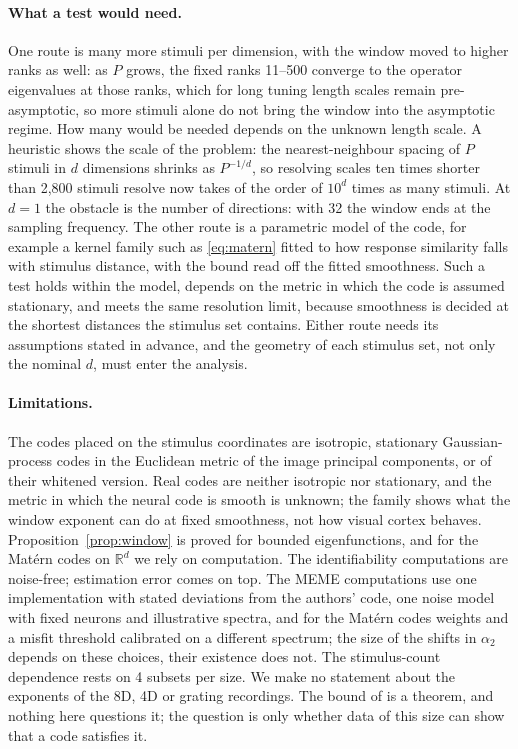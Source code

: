 \paragraph{What a test would need.} One route is many more stimuli per dimension, with the window moved to higher ranks as well: as $P$ grows, the fixed ranks 11--500 converge to the operator eigenvalues at those ranks, which for long tuning length scales remain pre-asymptotic, so more stimuli alone do not bring the window into the asymptotic regime. How many would be needed depends on the unknown length scale. A heuristic shows the scale of the problem: the nearest-neighbour spacing of $P$ stimuli in $d$ dimensions shrinks as $P^{-1/d}$, so resolving scales ten times shorter than 2,800 stimuli resolve now takes of the order of $10^d$ times as many stimuli. At $d = 1$ the obstacle is the number of directions: with 32 the window ends at the sampling frequency. The other route is a parametric model of the code, for example a kernel family such as \eqref{eq:matern} fitted to how response similarity falls with stimulus distance, with the bound read off the fitted smoothness. Such a test holds within the model, depends on the metric in which the code is assumed stationary, and meets the same resolution limit, because smoothness is decided at the shortest distances the stimulus set contains. Either route needs its assumptions stated in advance, and the geometry of each stimulus set, not only the nominal $d$, must enter the analysis.

\paragraph{Limitations.} The codes placed on the stimulus coordinates are isotropic, stationary Gaussian-process codes in the Euclidean metric of the image principal components, or of their whitened version. Real codes are neither isotropic nor stationary, and the metric in which the neural code is smooth is unknown; the family shows what the window exponent can do at fixed smoothness, not how visual cortex behaves. Proposition~\ref{prop:window} is proved for bounded eigenfunctions, and for the Mat\'ern codes on $\mathbb{R}^d$ we rely on computation. The identifiability computations are noise-free; estimation error comes on top. The MEME computations use one implementation with stated deviations from the authors' code, one noise model with fixed neurons and illustrative spectra, and for the Mat\'ern codes weights and a misfit threshold calibrated on a different spectrum; the size of the shifts in $\alpha_2$ depends on these choices, their existence does not. The stimulus-count dependence rests on 4 subsets per size. We make no statement about the exponents of the 8D, 4D or grating recordings. The bound of \cite{stringer2019} is a theorem, and nothing here questions it; the question is only whether data of this size can show that a code satisfies it.
